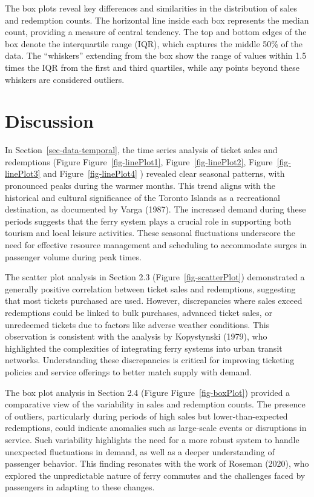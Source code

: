 \documentclass[
  letterpaper,
  DIV=11,
  numbers=noendperiod]{scrartcl}
\begin{document}
The box plots reveal key differences and similarities in the
distribution of sales and redemption counts. The horizontal line inside
each box represents the median count, providing a measure of central
tendency. The top and bottom edges of the box denote the interquartile
range (IQR), which captures the middle 50\% of the data. The
``whiskers'' extending from the box show the range of values within 1.5
times the IQR from the first and third quartiles, while any points
beyond these whiskers are considered outliers.

\section{Discussion}\label{sec-discussion}

In Section~\ref{sec-data-temporal}, the time series analysis of ticket
sales and redemptions (Figure Figure~\ref{fig-linePlot1},
Figure~\ref{fig-linePlot2}, Figure~\ref{fig-linePlot3} and
Figure~\ref{fig-linePlot4} ) revealed clear seasonal patterns, with
pronounced peaks during the warmer months. This trend aligns with the
historical and cultural significance of the Toronto Islands as a
recreational destination, as documented by Varga (1987). The increased
demand during these periods suggests that the ferry system plays a
crucial role in supporting both tourism and local leisure activities.
These seasonal fluctuations underscore the need for effective resource
management and scheduling to accommodate surges in passenger volume
during peak times.

The scatter plot analysis in Section 2.3 (Figure~\ref{fig-scatterPlot})
demonstrated a generally positive correlation between ticket sales and
redemptions, suggesting that most tickets purchased are used. However,
discrepancies where sales exceed redemptions could be linked to bulk
purchases, advanced ticket sales, or unredeemed tickets due to factors
like adverse weather conditions. This observation is consistent with the
analysis by Kopystynski (1979), who highlighted the complexities of
integrating ferry systems into urban transit networks. Understanding
these discrepancies is critical for improving ticketing policies and
service offerings to better match supply with demand.

The box plot analysis in Section 2.4 (Figure Figure~\ref{fig-boxPlot})
provided a comparative view of the variability in sales and redemption
counts. The presence of outliers, particularly during periods of high
sales but lower-than-expected redemptions, could indicate anomalies such
as large-scale events or disruptions in service. Such variability
highlights the need for a more robust system to handle unexpected
fluctuations in demand, as well as a deeper understanding of passenger
behavior. This finding resonates with the work of Roseman (2020), who
explored the unpredictable nature of ferry commutes and the challenges
faced by passengers in adapting to these changes.
\end{document}
